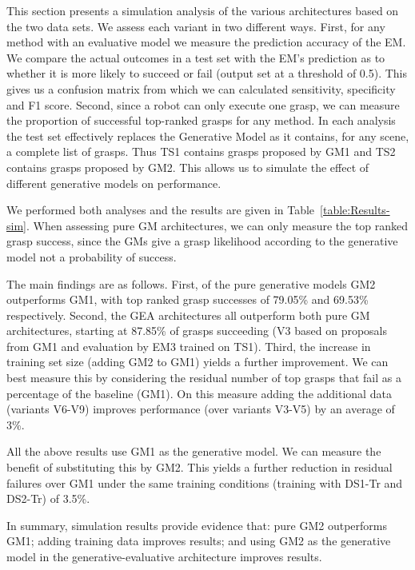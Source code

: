 This section presents a simulation analysis of the various architectures based on the two data sets. 
We assess each variant in two different ways. First, for any method with an evaluative model we  measure the prediction accuracy of the EM. We compare the actual outcomes in a test set with the EM's prediction as to whether it is more likely to succeed or fail (output set at a threshold of 0.5). This gives us a confusion matrix from which we can calculated sensitivity, specificity and F1 score. Second, since a robot can only execute one grasp, we can measure the proportion of successful top-ranked grasps for any method. In each analysis the test set effectively replaces the Generative Model as it contains, for any scene, a complete list of grasps. Thus TS1 contains grasps proposed by GM1 and TS2 contains grasps proposed by GM2. This allows us to simulate the effect of different generative models on performance. 

We performed both analyses and the results are given in Table~\ref{table:Results-sim}. When assessing pure GM architectures, we can only measure the top ranked grasp success, since the GMs give a grasp likelihood according to the generative model not a probability of success. 

The main findings are as follows. First, of the pure generative models GM2 outperforms GM1, with top ranked grasp successes of 79.05\% and 69.53\% respectively. Second, the GEA architectures all outperform both pure GM architectures, starting at 87.85\% of grasps succeeding (V3 based on proposals from GM1 and evaluation by EM3 trained on TS1). Third, the increase in training set size (adding GM2 to GM1) yields a further improvement. We can best measure this by considering the residual number of top grasps that fail as a percentage of the baseline (GM1). On this measure adding the additional data (variants V6-V9) improves performance (over variants V3-V5) by an average of 3\%. 

All the above results use GM1 as the generative model. We can measure the benefit of substituting this by GM2. This yields a further reduction in residual failures over GM1 under the same training conditions (training with DS1-Tr and DS2-Tr) of 3.5\%. 

In summary, simulation results provide evidence that: pure GM2 outperforms GM1; adding training data improves results; and using GM2 as the generative model in the generative-evaluative architecture improves results. 

